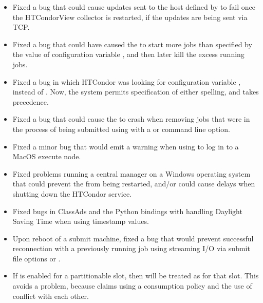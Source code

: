 \begin{itemize}

\item Fixed a bug that could cause updates sent to
the host defined by  
to fail once the HTCondorView collector is restarted,
if the updates are being sent via TCP.

\item Fixed a bug that could have caused the  to start more 
jobs than specified by the value of configuration variable 
,
and then later kill the excess running jobs.

\item Fixed a bug in which HTCondor was looking for configuration variable
, instead of .
Now, the system permits specification of either spelling,
and  takes precedence.

\item Fixed a bug that could cause the  to crash
when removing jobs that were in the process of being submitted
using  with a  or  
command line option.

\item Fixed a minor bug that would emit a  warning
when using  to log in to a MacOS execute node.
 
\item Fixed problems running a central manager on a Windows operating
system that could prevent the  from being restarted,
and/or could cause delays when shutting down the HTCondor service.

\item Fixed bugs in ClassAds and the Python bindings with handling
Daylight Saving Time when using timestamp values.

\item Upon reboot of a submit machine, fixed a bug that would 
	prevent successful reconnection with
	a previously running job 
	using streaming I/O via submit file
	options  or .

\item If  is enabled for a partitionable slot,
then  will be treated as
 for that slot.
This avoids a problem, because claims using a consumption policy
and the use of  conflict
with each other.


\end{itemize}
